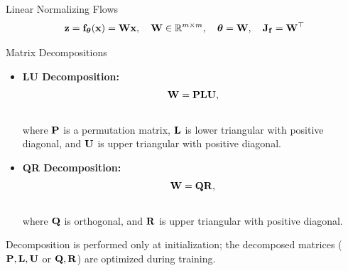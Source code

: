 \documentclass{beamer}
\begin{document}
\begin{frame}{Linear Normalizing Flows}
	\vspace{-0.3cm}
	\[
		\mathbf{z} = \mathbf{f}_{\boldsymbol{\theta}}(\mathbf{x}) = \mathbf{W} \mathbf{x}, \quad \mathbf{W} \in \mathbb{R}^{m \times m}, \quad \boldsymbol{\theta} = \mathbf{W}, \quad \mathbf{J}_{\mathbf{f}} = \mathbf{W}^\top
	\]
	\vspace{-0.7cm}
	\eqpause
	\begin{block}{Matrix Decompositions}
		\begin{itemize}
			\item \textbf{LU Decomposition:}
			\vspace{-0.3cm}
			\[
				\mathbf{W} = \mathbf{P} \mathbf{L} \mathbf{U},
			\]
			\vspace{-0.7cm} \\
			where $\mathbf{P}$ is a permutation matrix, $\mathbf{L}$ is lower triangular with positive diagonal, and $\mathbf{U}$ is upper triangular with positive diagonal.
			\eqpause
			\item \textbf{QR Decomposition:}
			\vspace{-0.3cm}
			\[
				\mathbf{W} = \mathbf{Q} \mathbf{R},
			\]
			\vspace{-0.7cm} \\
			where $\mathbf{Q}$ is orthogonal, and $\mathbf{R}$ is upper triangular with positive diagonal.
		\end{itemize}
	\end{block}
    \eqpause
	Decomposition is performed only at initialization; the decomposed matrices ($\mathbf{P}, \mathbf{L}, \mathbf{U}$ or $\mathbf{Q}, \mathbf{R}$) are optimized during training.

\end{frame}
\end{document}
